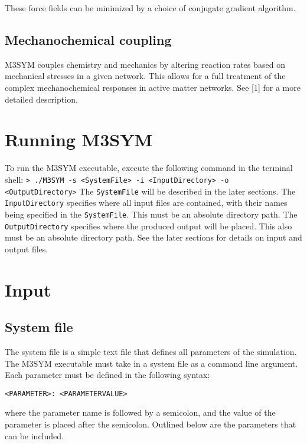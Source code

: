 \documentclass[11pt, oneside]{article}   	%
\begin{document}
\noindent These force fields can be minimized by a choice of conjugate gradient algorithm.

\subsection{Mechanochemical coupling} 

M3SYM couples chemistry and mechanics by altering reaction rates based on mechanical stresses in a given 
network. This allows for a full treatment of the complex mechanochemical responses in active matter networks.
See [1] for a more detailed description.

\section{Running M3SYM}

To run the M3SYM executable, execute the following command in the terminal shell: \newline \newline\indent \texttt{> ./M3SYM -s <SystemFile> -i <InputDirectory> -o <OutputDirectory>} \newline \newline The \texttt{SystemFile} will be described in the later sections. \newline\newline  The \texttt{InputDirectory} specifies where all input files are contained, with their names being specified in the \texttt{SystemFile}. This must be an absolute directory path. The \texttt{OutputDirectory} specifies where the produced output will be placed. This also must be an absolute directory path. See the later sections for details on input and output files.

\section {Input}

\subsection{System file}

The system file is a simple text file that defines all parameters of the simulation. The M3SYM executable must take
 in a system file as a command line argument. \newline\newline Each parameter must be defined in the following syntax: \newline \newline \centerline{\texttt{<PARAMETER>:  <PARAMETERVALUE>}} \newline\newline where the parameter name is followed by a semicolon, and the value of the parameter is placed after the semicolon. Outlined below are the parameters that can be included. \\
 
\end{document}
